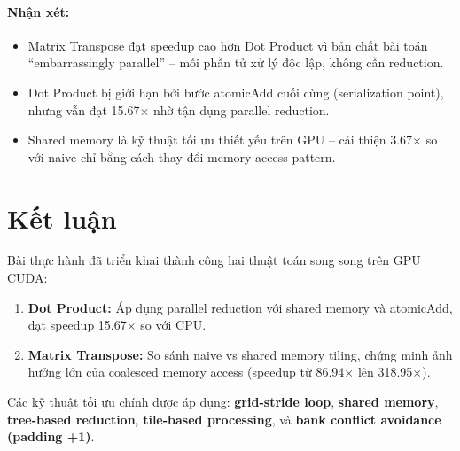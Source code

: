 \documentclass[12pt,a4paper]{article}
\begin{document}
\paragraph{Nhận xét:}
\begin{itemize}[leftmargin=2em]
    \item Matrix Transpose đạt speedup cao hơn Dot Product vì bản chất bài toán ``embarrassingly parallel'' -- mỗi phần tử xử lý độc lập, không cần reduction.
    \item Dot Product bị giới hạn bởi bước atomicAdd cuối cùng (serialization point), nhưng vẫn đạt 15.67$\times$ nhờ tận dụng parallel reduction.
    \item Shared memory là kỹ thuật tối ưu thiết yếu trên GPU -- cải thiện 3.67$\times$ so với naive chỉ bằng cách thay đổi memory access pattern.
\end{itemize}

\section{Kết luận}

Bài thực hành đã triển khai thành công hai thuật toán song song trên GPU CUDA:

\begin{enumerate}[leftmargin=2em]
    \item \textbf{Dot Product:} Áp dụng parallel reduction với shared memory và atomicAdd, đạt speedup 15.67$\times$ so với CPU.
    \item \textbf{Matrix Transpose:} So sánh naive vs shared memory tiling, chứng minh ảnh hưởng lớn của coalesced memory access (speedup từ 86.94$\times$ lên 318.95$\times$).
\end{enumerate}

Các kỹ thuật tối ưu chính được áp dụng: \textbf{grid-stride loop}, \textbf{shared memory}, \textbf{tree-based reduction}, \textbf{tile-based processing}, và \textbf{bank conflict avoidance (padding +1)}.
\end{document}
